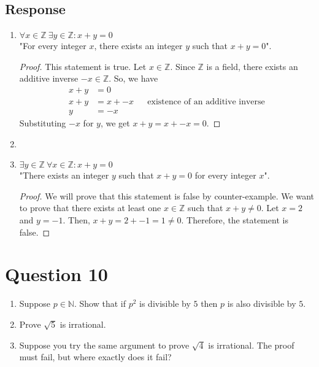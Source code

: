 \documentclass[13pt]{article}
\begin{document}
\subsection*{Response}
\begin{enumerate}[label=,leftmargin=0pt]
\item $\forall x \in \mathbb{Z} \ \exists y \in \mathbb{Z} : x + y = 0$ \\
"For every integer $x$, there exists an integer $y$ such that $x + y = 0$".
\begin{proof}
  This statement is true. Let $x \in \mathbb{Z}$. Since $\mathbb{Z}$ is a field, there exists an
  additive inverse $-x \in \mathbb{Z}$. So, we have
  \begin{align*}
    x + y &= 0 \\
    x + y &= x + -x && \text{existence of an additive inverse} \\
    y &= -x
  \end{align*}
  Substituting $-x$ for $y$, we get $x + y = x + -x = 0$.
\end{proof}
\item
\item $\exists y \in \mathbb{Z} \ \forall x \in \mathbb{Z} : x + y = 0$ \\
"There exists an integer $y$ such that $x + y = 0$ for every integer $x$".
\begin{proof}
  We will prove that this statement is false by counter-example. We want to prove that there exists at least one
  $x \in \mathbb{Z}$ such that $x + y \neq 0$. Let $x = 2$ and $y = -1$. Then, $x + y = 2 + -1 = 1 \neq 0$.
  Therefore, the statement is false.
\end{proof}
\end{enumerate}





\newpage
\section*{Question 10}
\begin{enumerate}[label=(\alph*)]
\item Suppose $p \in \mathbb{N}$. Show that if $p^2$ is divisible by $5$ then $p$ is also divisible by $5$.
\item Prove $\sqrt{5}$ is irrational.
\item Suppose you try the same argument to prove $\sqrt{4}$ is irrational. The proof must fail,
but where exactly does it fail?
\end{enumerate}
\end{document}
